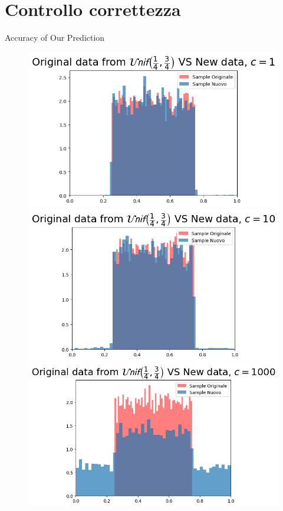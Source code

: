 \documentclass{beamer}
\begin{document}
\section{Controllo correttezza}
\begin{frame}{Accuracy of Our Prediction}
        \centering
    \begin{figure}
        \begin{minipage}{0.32\textwidth}
            \centering
            \includegraphics[width=\textwidth]{Predc1.png}
        \end{minipage}
        \hfill
        \begin{minipage}{0.32\textwidth}
            \centering
            \includegraphics[width=\textwidth]{Predc10.png}
        \end{minipage}
        \hfill
        \begin{minipage}{0.32\textwidth}
            \centering
            \includegraphics[width=\textwidth]{Predc1000.png}

\end{minipage}
\end{figure}
\end{frame}
\end{document}
